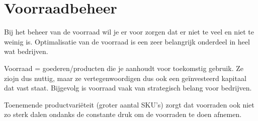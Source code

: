 \section{Voorraadbeheer}
Bij het beheer van de voorraad wil je er voor zorgen dat er niet te veel en niet te weinig is. Optimalisatie van de voorraad is een zeer belangrijk onderdeel in heel wat bedrijven.

Voorraad = goederen/producten die je aanhoudt voor toekomstig gebruik. Ze ziojn dus nuttig, maar ze vertegenwoordigen dus ook een ge\"investeerd kapitaal dat vast staat. Bijgevolg is voorraad vaak van strategisch belang voor bedrijven.

Toenemende productvari\"eteit (groter aantal SKU's) zorgt dat voorraden ook niet zo sterk dalen ondanks de constante druk om de voorraden te doen afnemen.
